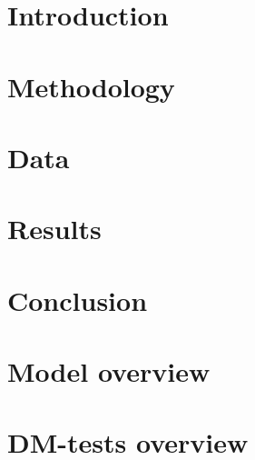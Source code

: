 \documentclass[a4paper,11pt]{report}
\begin{document}
\onehalfspacing



\tableofcontents
\newpage

\chapter{Introduction}
\label{chap:introduction}


\chapter{Methodology}
\label{chap:methodology}


\chapter{Data}
\label{chap:data}


\chapter{Results}
\label{chap:results}


\chapter{Conclusion}
\label{chap:conclusion}


\appendix
\chapter{Model overview}
\label{chap:model-overview}


\chapter{DM-tests overview}
\label{chap:dmtest-overview}


\printbibliography
\end{document}
